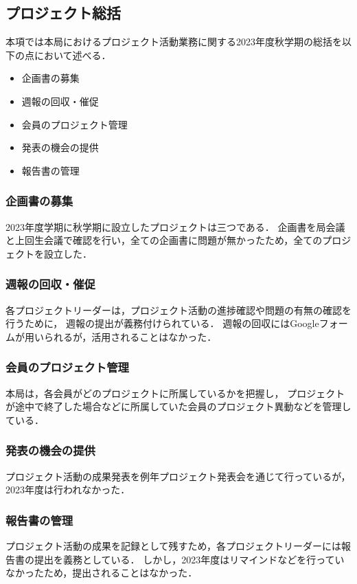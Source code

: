 \subsection*{プロジェクト総括}



本項では本局におけるプロジェクト活動業務に関する2023年度秋学期の総括を以下の点において述べる．

\begin{itemize}
  \item 企画書の募集
  \item 週報の回収・催促
  \item 会員のプロジェクト管理
  \item 発表の機会の提供
  \item 報告書の管理
\end{itemize}

\subsubsection*{企画書の募集}

2023年度学期に秋学期に設立したプロジェクトは三つである．
企画書を局会議と上回生会議で確認を行い，全ての企画書に問題が無かったため，全てのプロジェクトを設立した．

\subsubsection*{週報の回収・催促}

各プロジェクトリーダーは，プロジェクト活動の進捗確認や問題の有無の確認を行うために，
週報の提出が義務付けられている．
週報の回収にはGoogleフォームが用いられるが，活用されることはなかった．

\subsubsection*{会員のプロジェクト管理}

本局は，各会員がどのプロジェクトに所属しているかを把握し，
プロジェクトが途中で終了した場合などに所属していた会員のプロジェクト異動などを管理している．

\subsubsection*{発表の機会の提供}

プロジェクト活動の成果発表を例年プロジェクト発表会を通じて行っているが，2023年度は行われなかった．

\subsubsection*{報告書の管理}

プロジェクト活動の成果を記録として残すため，各プロジェクトリーダーには報告書の提出を義務としている．
しかし，2023年度はリマインドなどを行っていなかったため，提出されることはなかった．
